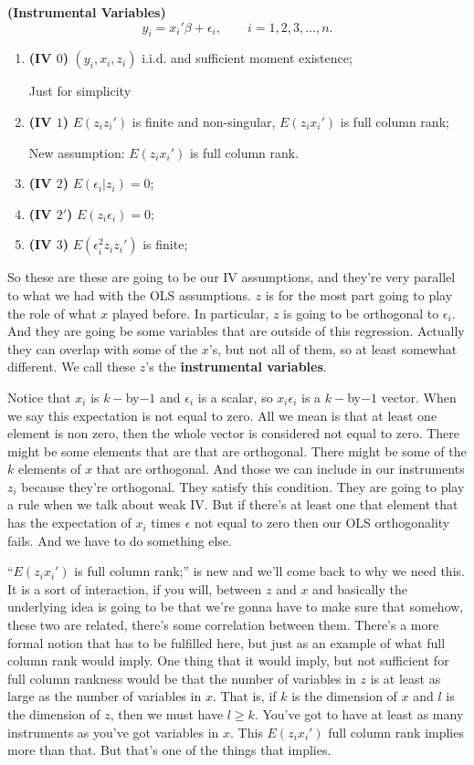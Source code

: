 \documentclass[11pt,a4paper]{amsart}
\theoremstyle{plain}
\theoremstyle{definition}
\begin{document}
 		 \textbf{(Instrumental Variables)} 
 		 \[	y_{i} = x_{i}' \beta + \epsilon_{i}, \qquad i= 1,2,3, \dots, n.	\]
 		 \begin{enumerate}
 		 	\item \textbf{(IV $0$)} $(y_{i}, x_{i}, z_{i})$ i.i.d. and sufficient moment existence;\par 
 		 	Just for simplicity
 		 	\item \textbf{(IV $1$)} $E(z_{i}z_{i}')$ is finite and non-singular, $E(z_{i}x_{i}')$ is full column rank;\par 
 		 	New assumption: $E(z_{i}x_{i}')$ is full column rank.
 		 	\item \textbf{(IV $2$)} $E(\epsilon_{i} | z_{i}) = 0$;
 		 		\item \textbf{(IV $2'$)} $E( z_{i}\epsilon_{i}) = 0$;
 		 	\item \textbf{(IV $3$)} $E(\epsilon_{i}^{2}z_{i}z_{i}')$ is finite;
 		 \end{enumerate}
 	 So these are these are going to be our IV assumptions, and they're very parallel to what we had with the OLS assumptions. $z$ is for the most part going to play the role of what $x$ played before. In particular, $z$ is going to be orthogonal to $\epsilon_{i}$. And they are going be some variables that are outside of this regression. Actually they can overlap with some of the $x$'s, but not all of them, so at least somewhat different. We call these $z$'s the \textbf{instrumental variables}.\par 
 	 Notice that $x_{i}$ is $k-$by$-1$ and $\epsilon_{i}$ is a scalar, so $x_{i}\epsilon_{i}$ is a  $k-$by$-1$ vector. When we say this expectation is not equal to zero. All we mean is that at least one element is non zero, then the whole vector is considered not equal to zero. There might be some elements that are that are orthogonal. There might be some of the $k$ elements of $x$ that are orthogonal. And those we can include in our instruments $z_{i}$ because they're orthogonal. They satisfy this condition. They are going to play a rule when we talk about weak IV. But if there's at least one that element that has the expectation of $x_{i}$ times $\epsilon$ not equal to zero then our OLS orthogonality fails. And we have to do something else. \par 
 	 ``$E(z_{i}x_{i}')$ is full column rank;'' is new and we'll come back to why we need this. It is a sort of interaction, if you will, between $z$ and $x$ and basically the underlying idea is going to be that we're gonna have to make sure that somehow, these two are related, there's some correlation between them. There's a more formal notion that has to be fulfilled here, but just as an example of what full column rank would imply. One thing that it would imply, but not sufficient for full column rankness would be that the number of variables in $z$ is at least as large as the number of variables in $x$. That is, if $k$ is the dimension of $x$ and $l$ is the dimension of $z$, then we must have $l \geq k$.  You've got to have at least as many instruments as you've got variables in $x$.  This $E(z_{i}x_{i}')$ full column rank implies more than that. But that's one of the things that implies. \par 
\end{document}
